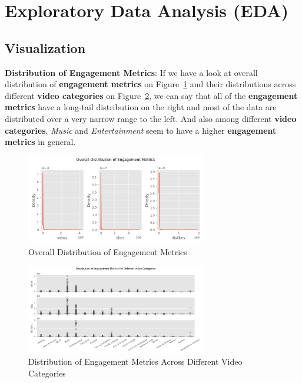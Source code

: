 \documentclass[a4paper,12pt]{article}
\begin{document}
\section*{Exploratory Data Analysis (EDA)}
\subsection*{Visualization}
\noindent \textbf{Distribution of Engagement Metrics}: If we have a look at overall distribution of \textbf{engagement metrics} on Figure~\ref{fig:Figure_1} and their distributions across different \textbf{video categories} on Figure~\ref{fig:Figure_2}, 
we can say that all of the \textbf{engagement metrics} have a long-tail distribution on the right and most of the data are distributed over a very narrow range to the left. And also among different \textbf{video categories}, 
\textit{Music} and \textit{Entertainment} seem to have a higher \textbf{engagement metrics} in general. \\ 

\begin{figure}[H]
    \centering
    \includegraphics[width=0.7\textwidth]{./images/overall_distro_of_eng_metrics.png}
    \caption{Overall Distribution of Engagement Metrics}
    \label{fig:Figure_1}
\end{figure}

\begin{figure}[H]
    \centering
    \includegraphics[width=0.7\textwidth]{./images/distro_of_eng_for_diff_cats.png}
    \caption{Distribution of Engagement Metrics Across Different Video Categories}
    \label{fig:Figure_2}
\end{figure}
\end{document}
